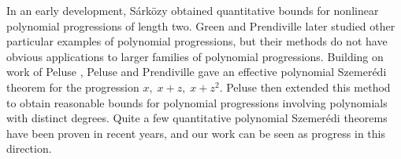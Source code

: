 \documentclass[11pt]{amsart}
\theoremstyle{definition}
\begin{document}
In an early development, S\'ark\"ozy \cite{Sa78a, Sa78b} obtained quantitative bounds for nonlinear polynomial progressions of length two. Green \cite{Gr02} and Prendiville \cite{Pre17} later studied other particular examples of polynomial progressions, but their methods do not have obvious applications to larger families of polynomial progressions.  Building on work of Peluse \cite{Pel18}, Peluse and Prendiville \cite{PP19} gave an effective polynomial Szemer\'edi theorem for the progression $x,\; x + z,\; x + z^2$. Peluse \cite{Pel19} then extended this method to obtain reasonable bounds for polynomial progressions involving polynomials with distinct degrees. Quite a few quantitative polynomial Szemer\'edi theorems \cite{BB23, HLY21, Kuc21a, Kuc23, Kuc22b, Leng22, Leng23a, PSS23} have been proven in recent years, and our work \cite{KKL24b} can be seen as progress in this direction. 
\end{document}
